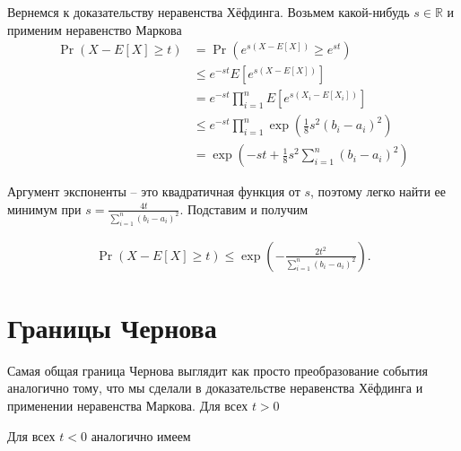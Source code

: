 \documentclass[12pt]{article}
\newcommand\R{\mathbb{R}}
\begin{document}
Вернемся к доказательству неравенства Хёфдинга. Возьмем какой-нибудь $s \in \R$ и применим неравенство Маркова
\begin{align*}
  \Pr(X - E[X] \ge t) &= \Pr(e^{s(X - E[X])} \ge e^{st}) \\
                      &\le e^{-st} E[e^{s(X - E[X])}] \\
                      &= e^{-st} \prod_{i = 1}^n E[e^{s(X_i - E[X_i])}] \\
                      &\le e^{-st} \prod_{i = 1}^n \exp\left(\frac{1}{8}s^2(b_i - a_i)^2\right) \\
                      &= \exp\left(-st + \frac{1}{8}s^2 \sum_{i = 1}^n (b_i - a_i)^2\right)
\end{align*}

Аргумент экспоненты -- это квадратичная функция от $s$, поэтому легко найти ее минимум при $s = \frac{4t}{\sum_{i = 1}^n (b_i - a_i)^2}$. Подставим и получим

\begin{align*}
  \Pr(X - E[X] \ge t) \le \exp\left(-\frac{2t^2}{\sum_{i = 1}^n (b_i - a_i)^2}\right).
\end{align*}

\section{Границы Чернова}

Самая общая граница Чернова выглядит как просто преобразование события аналогично тому, что мы сделали в доказательстве неравенства Хёфдинга и применении неравенства Маркова. Для всех $t > 0$
\begin{center}
\end{center}

Для всех $t < 0$ аналогично имеем
\begin{center}
\end{center}
\end{document}
